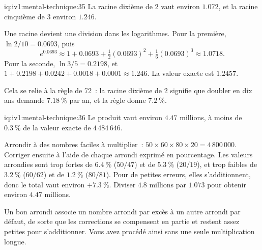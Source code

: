 \begin{solution}{iq:iv1:mental-technique:35}
La racine dixième de 2 vaut environ $1.072$, et la racine cinquième de 3 environ $1.246$.

Une racine devient une division dans les logarithmes. Pour la première, $\ln 2 / 10 = 0.0693$, puis
\[
e^{0.0693} \approx 1 + 0.0693 + \tfrac12 (0.0693)^2 + \tfrac16 (0.0693)^3 \approx 1.0718.
\]
Pour la seconde, $\ln 3 / 5 = 0.2198$, et $1 + 0.2198 + 0.0242 + 0.0018 + 0.0001 \approx 1.246$. La valeur exacte est $1.2457$.

Cela se relie à la règle de 72~: la racine dixième de 2 signifie que doubler en dix ans demande $7.18~\%$ par an, et la règle donne $7.2~\%$.

\end{solution}

\begin{solution}{iq:iv1:mental-technique:36}
Le produit vaut environ $4.47$ millions, à moins de $0.3~\%$ de la valeur exacte de $4\,484\,646$.

Arrondir à des nombres faciles à multiplier~: $50 \times 60 \times 80 \times 20 = 4\,800\,000$. Corriger ensuite à l'aide de chaque arrondi exprimé en pourcentage. Les valeurs arrondies sont trop fortes de $6.4~\%$ ($50/47$) et de $5.3~\%$ ($20/19$), et trop faibles de $3.2~\%$ ($60/62$) et de $1.2~\%$ ($80/81$). Pour de petites erreurs, elles s'additionnent, donc le total vaut environ $+7.3~\%$. Diviser $4.8$ millions par $1.073$ pour obtenir environ $4.47$ millions.

Un bon arrondi associe un nombre arrondi par excès à un autre arrondi par défaut, de sorte que les corrections se compensent en partie et restent assez petites pour s'additionner. Vous avez procédé ainsi sans une seule multiplication longue.

\end{solution}

